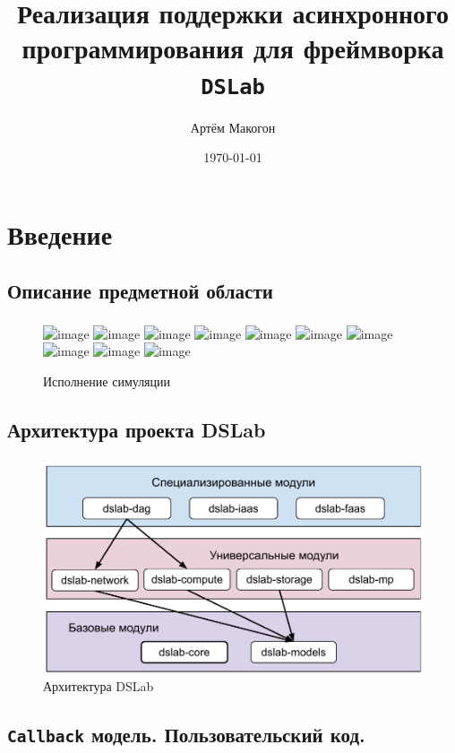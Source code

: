 \documentclass[t]{beamer}  %
\title{Реализация поддержки асинхронного программирования для фреймворка \texttt{DSLab}}
\author{Артём Макогон}
\date{\today}
\begin{document}
	
	\begin{frame}
		\maketitle
	\end{frame}
	

    \section{Введение}
    \subsection{Описание предметной области}


    \begin{frame}
    \frametitle{\insertsection} 
	\framesubtitle{\insertsubsection}

	\begin{figure}
		\centering
		\includegraphics<1>[width=\linewidth]{images/event_pipeline_0}
		\includegraphics<2>[width=\linewidth]{images/event_pipeline_1}
		\includegraphics<3>[width=\linewidth]{images/event_pipeline_2}
		\includegraphics<4>[width=\linewidth]{images/event_pipeline_3}
		\includegraphics<5>[width=\linewidth]{images/event_pipeline_4}
		\includegraphics<6>[width=\linewidth]{images/event_pipeline_5}
		\includegraphics<7>[width=\linewidth]{images/event_pipeline_6}
		\includegraphics<8>[width=\linewidth]{images/event_pipeline_7}
		\includegraphics<9>[width=\linewidth]{images/event_pipeline_8}
		\includegraphics<10>[width=\linewidth]{images/event_pipeline_9}
		\label{simulation}
		\caption*{Исполнение симуляции}
	\end{figure}
        
    \end{frame}

	\subsection{Архитектура проекта DSLab}
	\begin{frame}
		\frametitle{\insertsection} 
		\framesubtitle{\insertsubsection}

		\begin{figure}[H]
			\centering
			\includegraphics[width=0.9\linewidth]{images/dslab_arc}
			\caption*{Архитектура DSLab}
			\label{dslab_arc}
		\end{figure}
	\end{frame}
	

	\subsection{\texttt{Callback} модель. Пользовательский код.}
	\begin{frame}
		\frametitle{\insertsection} 
		\framesubtitle{\insertsubsection}

	\end{frame}
\end{document}

